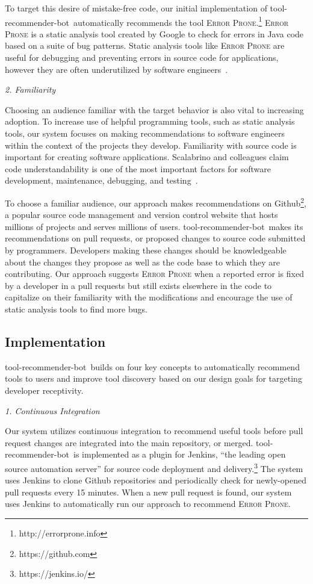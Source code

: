 \documentclass[conference]{IEEEtran}
\newcommand{\tool}{tool-recommender-bot}
\newcommand{\pseudosubsection}[1]{\vspace{2mm} {\it #1}}
\begin{document}
To target this desire of mistake-free code, our initial implementation of \tool~automatically recommends the tool \textsc{Error Prone}.\footnote{http://errorprone.info} \textsc{Error Prone} is a static analysis tool created by Google to check for errors in Java code based on a suite of bug patterns. Static analysis tools like \textsc{Error Prone} are useful for debugging and preventing errors in source code for applications, however they are often underutilized by software engineers~\cite{Johnson2013Why}. 

\pseudosubsection{2. Familiarity}

Choosing an audience familiar with the target behavior is also vital to increasing adoption. To increase use of helpful programming tools, such as static analysis tools, our system focuses on making recommendations to software engineers within the context of the projects they develop. Familiarity with source code is important for creating software applications. Scalabrino and colleagues claim code understandability is one of the most important factors for software development, maintenance, debugging, and testing~\cite{Scalabrino2017Understandability}.

To choose a familiar audience, our approach makes recommendations on Github\footnote{https://github.com}, a popular source code management and version control website that hosts millions of projects and serves millions of users. \tool~makes its recommendations on pull requests, or proposed changes to source code submitted by programmers. Developers making these changes should be knowledgeable about the changes they propose as well as the code base to which they are contributing. Our approach suggests \textsc{Error Prone} when a reported error is fixed by a developer in a pull requests but still exists elsewhere in the code to capitalize on their familiarity with the modifications and encourage the use of static analysis tools to find more bugs. 

\subsection{Implementation}

\tool~builds on four key concepts to automatically recommend tools to users and improve tool discovery based on our design goals for targeting developer receptivity.

\pseudosubsection{1. Continuous Integration}

Our system utilizes continuous integration to recommend useful tools before pull request changes are integrated into the main repository, or merged. \tool~is implemented as a plugin for Jenkins, ``the leading open source automation server'' for source code deployment and delivery.\footnote{https://jenkins.io/} The system uses Jenkins to clone Github repositories and periodically check for newly-opened pull requests every 15 minutes. When a new pull request is found, our system uses Jenkins to automatically run our approach to recommend \textsc{Error Prone}.
\end{document}
